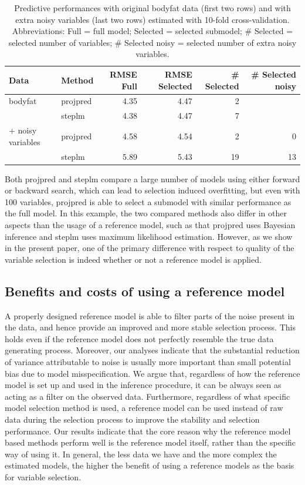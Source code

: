 \documentclass[a4]{article}
\theoremstyle{definition}
\begin{document}
\begin{table}[tp]
\footnotesize
\centering
\begin{tabular}{ll|rrrr}
Data  & Method & RMSE Full & RMSE Selected & \# Selected & \# Selected noisy \\ 
  \hline
bodyfat & projpred & 4.35 & 4.47 & 2 &   \\
& steplm & 4.38 & 4.47 & 7 &  \\
\hline
+ noisy variables & projpred & 4.58 & 4.54 & 2 & 0  \\
& steplm & 5.89 & 5.43 & 19 & 13 \\
\end{tabular}
\caption{Predictive performances with original bodyfat data (first two
  rows) and with extra noisy variables (last two rows) estimated with
  10-fold cross-validation. Abbreviations: Full = full model; Selected =
  selected submodel; \# Selected = selected number of variables;
  \# Selected noisy = selected number of extra noisy variables.}
\label{tab:model_performances}
\end{table}

Both projpred and steplm compare a large number of models using either
forward or backward search, which can lead to selection induced
overfitting, but even with 100 variables, projpred is able to select a
submodel with similar performance as the full model. In this example, the two
 compared methods also differ in other aspects than the usage of a reference 
 model, such as that projpred
uses Bayesian inference and steplm uses maximum likelihood estimation. 
However, as we show in the present paper, one of the primary difference 
with respect to quality of the variable selection is indeed whether or 
not a reference model is applied.

\subsection{Benefits and costs of using a reference model}

A properly designed reference model is able to filter parts of the
noise present in the data, and hence provide an improved and more
stable selection process. This holds even if the reference model does
not perfectly resemble the true data generating process. Moreover, our
analyses indicate that the substantial reduction of variance
attributable to noise is usually more important than small potential
bias due to model misspecification.  We argue that, regardless of how
the reference model is set up and used in the inference procedure, it
can be always seen as acting as a filter on the observed
data. Furthermore, regardless of what specific model selection method
is used, a reference model can be used instead of raw data during the
selection process to improve the stability and selection
performance. Our results indicate that the core reason why the
reference model based methods perform well is the reference model
itself, rather than the specific way of using it.  In general, the
less data we have and the more complex the estimated models, the
higher the benefit of using a reference models as the basis for
variable selection.
\end{document}
